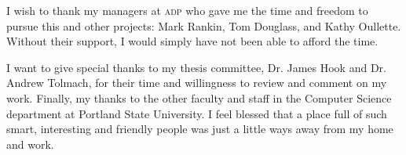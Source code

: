 I wish to thank my managers at \textsc{adp} who gave me the time and
freedom to pursue this and other projects: Mark Rankin, Tom Douglass,
and Kathy Oullette. Without their support, I would simply have not
been able to afford the time.

I want to give special thanks to my thesis committee, Dr. James Hook
and Dr. Andrew Tolmach, for their time and willingness to review and
comment on my work. Finally, my thanks to the other faculty and staff in the
Computer Science department at Portland State University. I feel
blessed that a place full of such smart, interesting and friendly
people was just a little ways away from my home and work.

\newpage

\singlespacing
\tableofcontents
\newpage
{}
\listoffigures
\newpage

